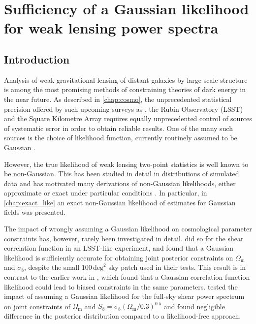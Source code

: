 
% 
% 

% 

\chapter{Sufficiency of a Gaussian likelihood for weak lensing power spectra}
\label{chap:gauss_like}
\graphicspath{{../Figs/gauss_like/}{Figs/gauss_like/}}

\section{Introduction}

Analysis of weak gravitational lensing of distant galaxies by large scale structure is among the most promising methods of constraining theories of dark energy in the near future. As described in \autoref{chap:cosmo}, the unprecedented statistical precision offered by such upcoming surveys as \Euclid{}, the Rubin Observatory (LSST) and the Square Kilometre Array requires equally unprecedented control of sources of systematic error in order to obtain reliable results. One of the many such sources is the choice of likelihood function, currently routinely assumed to be Gaussian \citep[e.g.][]{Troxel2018, Hikage2019, Joachimi2021}.

However, the true likelihood of weak lensing two-point statistics is well known to be non-Gaussian. This has been studied in detail in distributions of simulated data \citep{Sellentin2018, Sellentin2018a, DiazRivero2020, Louca2020} and has motivated many derivations of non-Gaussian likelihoods, either approximate or exact under particular conditions \citep{Taruya2002, Sato2010, Sato2011, Hilbert2011, Keitel2011, Wilking2013, Sellentin2015, Wilking2015, Manrique-Yus2020, DiazRivero2020, Hall2022}. In particular, in \autoref{chap:exact_like} an exact non-Gaussian likelihood of \pcl{} estimates for Gaussian fields was presented.

The impact of wrongly assuming a Gaussian likelihood on cosmological parameter constraints has, however, rarely been investigated in detail. \citet{Lin2020} did so for the shear correlation function in an LSST-like experiment, and found that a Gaussian likelihood is sufficiently accurate for obtaining joint posterior constraints on $\Omega_\text{m}$ and $\sigma_8$, despite the small $100\,\text{deg}^2$ sky patch used in their tests. This result is in contrast to the earlier work in \citet{Hartlap2009}, which found that a Gaussian correlation function likelihood could lead to biased constraints in the same parameters. \citet{Taylor2019} tested the impact of assuming a Gaussian likelihood for the full-sky shear power spectrum on joint constraints of $\Omega_\text{m}$ and $S_8 = \sigma_8 (\Omega_\text{m} / 0.3)^{0.5}$ and found negligible difference in the posterior distribution compared to a likelihood-free approach.

